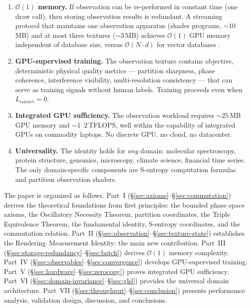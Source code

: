 \documentclass[11pt,twocolumn,a4paper]{article}
\newcommand{\BigO}{\mathcal{O}}
\begin{document}
\begin{enumerate}[leftmargin=*,itemsep=2pt]
\item \textbf{$\BigO(1)$ memory.} If observation can be
re-performed in constant time (one draw call), then storing
observation results is redundant. A streaming protocol that
maintains one observation apparatus (shader programs, $\sim\!10$\,MB)
and at most three textures ($\sim\!3$\,MB) achieves $\BigO(1)$ GPU
memory independent of database size, versus $\BigO(N \cdot d)$ for
vector databases \citep{johnson2019,milvus2021}.

\item \textbf{GPU-supervised training.} The observation texture
contains objective, deterministic physical quality metrics ---
partition sharpness, phase coherence, interference visibility,
multi-resolution consistency --- that can serve as training signals
without human labels. Training proceeds even when $L_{\text{correct}}=0$.

\item \textbf{Integrated GPU sufficiency.} The observation workload
requires $\sim\!25$\,MB GPU memory and $\sim\!1$--$2$\,TFLOPS,
well within the capability of integrated GPUs on commodity
laptops. No discrete GPU, no cloud, no datacenter.

\item \textbf{Universality.} The identity holds for \emph{any}
domain: molecular spectroscopy, protein structure, genomics,
microscopy, climate science, financial time series. The only
domain-specific components are S-entropy computation formulas and
partition observation shaders.
\end{enumerate}

The paper is organized as follows. Part~I
(\S\ref{sec:axioms}--\S\ref{sec:commutation}) derives the
theoretical foundations from first principles: the bounded phase space
axioms, the Oscillatory Necessity Theorem, partition coordinates,
the Triple Equivalence Theorem, the fundamental identity, S-entropy
coordinates, and the commutation relation. Part~II
(\S\ref{sec:observation}--\S\ref{sec:texture-state}) establishes the
Rendering--Measurement Identity: the main new contribution. Part~III
(\S\ref{sec:storage-redundancy}--\S\ref{sec:batch}) derives
$\BigO(1)$ memory complexity. Part~IV
(\S\ref{sec:observables}--\S\ref{sec:convergence}) develops
GPU-supervised training. Part~V
(\S\ref{sec:hardware}--\S\ref{sec:zerocopy}) proves integrated GPU
sufficiency. Part~VI
(\S\ref{sec:domain-invariance}--\S\ref{sec:glsl}) provides the
universal domain architecture. Part~VII
(\S\ref{sec:throughput}--\S\ref{sec:conclusion}) presents performance
analysis, validation design, discussion, and conclusions.
\end{document}
